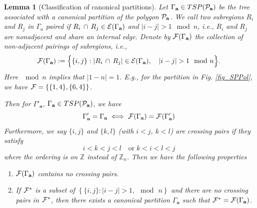 \documentclass[10pt,reqno]{article}
\theoremstyle{plain} %
\newtheorem{lemma}[theorem]{Lemma}
\theoremstyle{remark}
\numberwithin{equation}{section}
\begin{document}
\begin{lemma}[Classification of canonical partitions]\label{lem_CSP}
Let $\Gamma_\textbf{a}\in TSP({\cal P}_\textbf{a})$ be the tree associated with a canonical partition of the polygon ${\cal P}_{\textbf{a}}$. We call two subregions $R_i$ and $R_j$ in $\Gamma_a$ paired if $R_i\,\cap\,R_j\in {\cal E}(\Gamma_{\textbf{a}})$ and $|i-j|>1 \mod n$, i.e., $R_i$ and $R_j$ are
nonadjacent and share an internal edge.
Denote by ${\cal F}(\Gamma_{\textbf{a}})$ the collection
of non-adjacent pairings of subregions, i.e., 
\begin{equation}\label{set_csp}
{\cal F}(\Gamma_{\textbf{a}}):=
\Big\{\{i,j\}: |R_i\,\cap\,R_j|\in {\cal E} (\Gamma_{\textbf{a}}),    \quad |i-j|>1 \mod n \Big\}.  
\end{equation}
Here  $\mod n$ implies that $|1- n |= 1$. 
 E.g., for the partition in Fig. \ref{fig_SPPol}, we have ${\cal F}=\{\{1,4\},\{6,4\} \}$. 

Then for  $\Gamma'_\textbf{a}$, $\Gamma_\textbf{a} \in TSP({\cal P}_\textbf{a})$, we have 
$$
\Gamma'_\textbf{a}=\Gamma _\textbf{a}\iff {\cal F}(\Gamma_{\textbf{a}})={\cal F}(\Gamma'_{\textbf{a}})
$$
Furthermore,  we say $\{i,j\}$ and  $\{k,l\}$ (with $i<j$, $k<l$) are crossing pairs if they satisfy 
 $$
 i<k<j<l \quad \text{or} \;  k<i<l<j
 $$
 where the ordering is on $\mathbb Z$ instead of $\mathbb Z_n$. 
 Then we have the following properties 
 \begin{enumerate}
     \item  ${\cal F}(\Gamma_{\textbf{a}})$ contains  {\textit no} crossing pairs.
     \item If ${\cal F}^*$ is a subset of $\left\{\{i, j\}:   | i-j|>1, \mod  \, n\right\}$ and there are {\textit no} crossing pairs in ${\cal F}^*$, then there exists a 
     canonical partition $\Gamma_{\textbf{a}}$ such that  ${\cal F}^*={\cal F}(\Gamma_{\textbf{a}})$.
 \end{enumerate}
\end{lemma}
\end{document}
